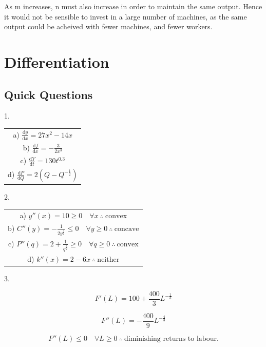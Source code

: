 \documentclass{article}
\newcommand{\dd}[1]{\mathrm{d}#1}
\begin{document}
As m increases, n must also increase in order to maintain the same output. Hence it would not be sensible to invest in a large number of machines, as the same output could be acheived with fewer machines, and fewer workers.

\clearpage

\section{Differentiation}

\subsection{Quick Questions}

\noindent

1.

\begin{center}
  \begin{tabular}{c}
    a) $\frac{\dd y}{\dd x} = 27x^2 - 14x$ \\
    b) $\frac{\dd f}{\dd x} = -\frac{3}{2x^3}$ \\
    c) $\frac{\dd Y}{\dd t} = 130t^{0.3}$ \\
    d) $\frac{\dd P}{\dd Q} = 2(Q - Q^{-\frac{1}{2}})$
  \end{tabular}
\end{center}

2.

\begin{center}
  \begin{tabular}{c}
    a) $y''(x) = 10 \geq 0 \quad \forall x \: \therefore \: \text{convex}$ \\
    b) $C''(y) = -\frac{1}{2y^{\frac{1}{2}}} \leq 0 \quad \forall y \geq 0 \: \therefore \: \text{concave}$ \\
    c) $P''(q) = 2 + \frac{1}{q^{\frac{3}{2}}} \geq 0 \quad \forall q \geq 0 \: \therefore \: \text{convex}$ \\
    d) $k''(x) = 2-6x \: \therefore \: \text{neither}$
  \end{tabular}
\end{center}

3.

$$
  F'(L) = 100 + \frac{400}{3}L^{-\frac{1}{3}}
$$

$$
  F''(L) = -\frac{400}{9}L^{-\frac{4}{3}}
$$

$$
  F''(L) \leq 0 \quad \forall L \geq 0 \: \therefore \: \text{diminishing returns to labour.}
$$
\end{document}
